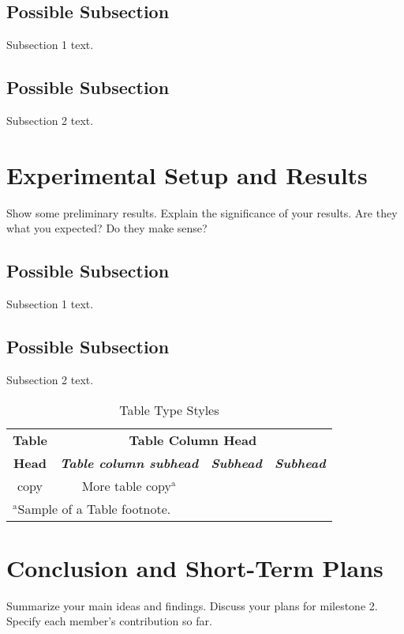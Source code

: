 \documentclass[conference]{IEEEtran}
\begin{document}
\subsection{Possible Subsection}
Subsection 1 text.

\subsection{Possible Subsection}
Subsection 2 text.


\section{Experimental Setup and Results}
Show some preliminary results. Explain the significance of your results. Are they what you expected? Do they make sense?

\subsection{Possible Subsection}
Subsection 1 text.

\subsection{Possible Subsection}
Subsection 2 text.

\begin{table}[htbp]
\caption{Table Type Styles}
\begin{center}
\begin{tabular}{|c|c|c|c|}
\hline
\textbf{Table}&\multicolumn{3}{|c|}{\textbf{Table Column Head}} \\
\cline{2-4} 
\textbf{Head} & \textbf{\textit{Table column subhead}}& \textbf{\textit{Subhead}}& \textbf{\textit{Subhead}} \\
\hline
copy& More table copy$^{\mathrm{a}}$& &  \\
\hline
\multicolumn{4}{l}{$^{\mathrm{a}}$Sample of a Table footnote.}
\end{tabular}
\label{tab1}
\end{center}
\end{table}

\section{Conclusion and Short-Term Plans}
Summarize your main ideas and findings. Discuss your plans for milestone 2. Specify each member’s contribution so far. 


\begin{thebibliography}{00}
\end{thebibliography}
\end{document}
